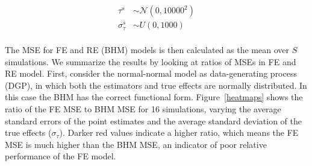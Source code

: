 \documentclass[12pt]{article}
\begin{document}
% 
% 



\begin{equation}
\begin{aligned}
\tau^s &\sim \mathcal{N}(0, 10000^2) \\
\sigma_{\tau}^s &\sim U(0,1000) \\
\end{aligned}
\end{equation}


The MSE for FE and RE (BHM) models is then calculated as the mean over $S$ simulations. We summarize the results by looking at ratios of MSEs in FE and RE model. 
First, consider the normal-normal model as data-generating process (DGP), in which both the estimators and true effects are normally distributed. In this case the BHM has the correct functional form. Figure~\ref{heatmaps} shows the ratio of the FE MSE to BHM MSE for 16 simulations, varying the average standard errors of the point estimates and the average standard deviation of the true effects ($\sigma_{\tau}$). Darker red values indicate a higher ratio, which means the FE MSE is much higher than the BHM MSE, an indicator of poor relative performance of the FE model.
\end{document}
